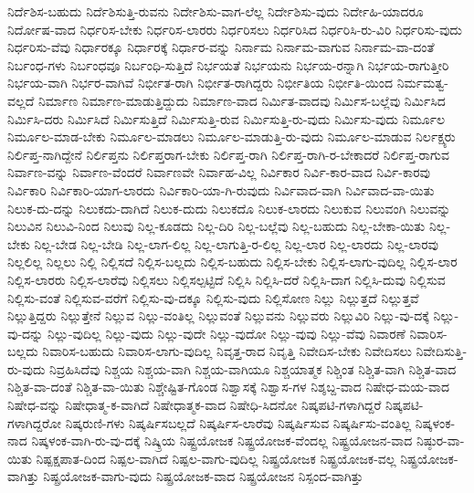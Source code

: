 {ನಿರ್ದೆಶಿಸ-ಬಹುದು
ನಿರ್ದೆಶಿಸುತ್ತಿ-ರುವನು
ನಿರ್ದೇಶಿಸು-ವಾಗ-ಲೆಲ್ಲ
ನಿರ್ದೇಶಿಸು-ವುದು
ನಿರ್ದೇಹಿ-ಯಾದರೂ
ನಿರ್ದೋಷ-ವಾದ
ನಿರ್ಧರಿಸ-ಬೇಕು
ನಿರ್ಧರಿಸ-ಲಾರರು
ನಿರ್ಧರಿಸಲು
ನಿರ್ಧರಿಸಿದ
ನಿರ್ಧರಿಸಿ-ರು-ವಿರಿ
ನಿರ್ಧರಿಸು-ವುದು
ನಿರ್ಧರಿಸು-ವೆವು
ನಿರ್ಧಾರಕ್ಕೂ
ನಿರ್ಧಾರಕ್ಕೆ
ನಿರ್ಧಾರ-ವನ್ನು
ನಿರ್ನಾಮ
ನಿರ್ನಾಮ-ವಾಗುವ
ನಿರ್ನಾಮ-ವಾ-ದಂತೆ
ನಿರ್ಬಂಧ-ಗಳು
ನಿರ್ಬಂಧವೂ
ನಿರ್ಬಂಧಿ-ಸುತ್ತಿದೆ
ನಿರ್ಭಯತೆ
ನಿರ್ಭಯನು
ನಿರ್ಭಯ-ರನ್ನಾಗಿ
ನಿರ್ಭಯ-ರಾಗುತ್ತೀರಿ
ನಿರ್ಭಯ-ವಾಗಿ
ನಿರ್ಭರ-ವಾಗಿವೆ
ನಿರ್ಭೀತ-ರಾಗಿ
ನಿರ್ಭೀತ-ರಾಗಿದ್ದರು
ನಿರ್ಭೀತಿಯ
ನಿರ್ಭೀತಿ-ಯಿಂದ
ನಿರ್ಮಮತ್ವ-ವಲ್ಲದೆ
ನಿರ್ಮಾಣ
ನಿರ್ಮಾಣ-ಮಾಡುತ್ತಿದ್ದುದು
ನಿರ್ಮಾಣ-ವಾದ
ನಿರ್ಮಿತ-ವಾದವು
ನಿರ್ಮಿಸ-ಬಲ್ಲೆವು
ನಿರ್ಮಿಸಿದ
ನಿರ್ಮಿಸಿ-ದರು
ನಿರ್ಮಿಸಿದೆ
ನಿರ್ಮಿಸುತ್ತಿದೆ
ನಿರ್ಮಿಸುತ್ತಿ-ರುವ
ನಿರ್ಮಿಸುತ್ತಿ-ರು-ವುದು
ನಿರ್ಮಿಸು-ವುದು
ನಿರ್ಮೂಲ
ನಿರ್ಮೂಲ-ಮಾಡ-ಬೇಕು
ನಿರ್ಮೂಲ-ಮಾಡಲು
ನಿರ್ಮೂಲ-ಮಾಡುತ್ತಿ-ರು-ವುದು
ನಿರ್ಮೂಲ-ಮಾಡುವ
ನಿರ್ಲಕ್ಷ್ಯರು
ನಿರ್ಲಿಪ್ತ-ನಾಗಿದ್ದೇನೆ
ನಿರ್ಲಿಪ್ತನು
ನಿರ್ಲಿಪ್ತರಾಗ-ಬೇಕು
ನಿರ್ಲಿಪ್ತ-ರಾಗಿ
ನಿರ್ಲಿಪ್ತ-ರಾಗಿ-ರ-ಬೇಕಾದರೆ
ನಿರ್ಲಿಪ್ತ-ರಾಗುವ
ನಿರ್ವಾಣ-ವನ್ನು
ನಿರ್ವಾಣ-ವೆಂದರೆ
ನಿರ್ವಾಣವೇ
ನಿರ್ವಾಹ-ವಿಲ್ಲ
ನಿರ್ವಿಕಾರ
ನಿರ್ವಿ-ಕಾರ-ವಾದ
ನಿರ್ವಿ-ಕಾರವು
ನಿರ್ವಿಕಾರಿ
ನಿರ್ವಿಕಾರಿ-ಯಾಗ-ಲಾರದು
ನಿರ್ವಿಕಾರಿ-ಯಾ-ಗಿ-ರುವುದು
ನಿರ್ವಿವಾದ-ವಾಗಿ
ನಿರ್ವಿವಾದ-ವಾ-ಯಿತು
ನಿಲುಕ-ದು-ದನ್ನು
ನಿಲುಕದು-ದಾಗಿದೆ
ನಿಲುಕ-ದುದು
ನಿಲುಕದೊ
ನಿಲುಕ-ಲಾರದು
ನಿಲುಕುವ
ನಿಲುವಂಗಿ
ನಿಲುವನ್ನು
ನಿಲುವಿನ
ನಿಲುವಿ-ನಿಂದ
ನಿಲುವು
ನಿಲ್ಲ-ಕೂಡದು
ನಿಲ್ಲ-ದಿರಿ
ನಿಲ್ಲ-ಬಲ್ಲೆವು
ನಿಲ್ಲ-ಬಹುದು
ನಿಲ್ಲ-ಬೇಕಾ-ಯಿತು
ನಿಲ್ಲ-ಬೇಕು
ನಿಲ್ಲ-ಬೇಡ
ನಿಲ್ಲ-ಬೇಡಿ
ನಿಲ್ಲ-ಲಾಗ-ಲಿಲ್ಲ
ನಿಲ್ಲ-ಲಾಗುತ್ತಿ-ರ-ಲಿಲ್ಲ
ನಿಲ್ಲ-ಲಾರ
ನಿಲ್ಲ-ಲಾರದು
ನಿಲ್ಲ-ಲಾರವು
ನಿಲ್ಲಲಿಲ್ಲ
ನಿಲ್ಲಲು
ನಿಲ್ಲಿ
ನಿಲ್ಲಿಸದೆ
ನಿಲ್ಲಿಸ-ಬಲ್ಲದು
ನಿಲ್ಲಿಸ-ಬಹುದು
ನಿಲ್ಲಿಸ-ಬೇಕು
ನಿಲ್ಲಿಸ-ಲಾಗು-ವುದಿಲ್ಲ
ನಿಲ್ಲಿಸ-ಲಾರ
ನಿಲ್ಲಿಸ-ಲಾರರು
ನಿಲ್ಲಿಸ-ಲಾರೆವು
ನಿಲ್ಲಿಸಲು
ನಿಲ್ಲಿಸಲ್ಪಟ್ಟಿದೆ
ನಿಲ್ಲಿಸಿ
ನಿಲ್ಲಿಸಿ-ದರೆ
ನಿಲ್ಲಿಸಿ-ದಾಗ
ನಿಲ್ಲಿಸಿ-ದುವು
ನಿಲ್ಲಿಸುವ
ನಿಲ್ಲಿಸು-ವಂತೆ
ನಿಲ್ಲಿಸುವ-ವರೆಗೆ
ನಿಲ್ಲಿಸು-ವು-ದಕ್ಕೂ
ನಿಲ್ಲಿಸು-ವುದು
ನಿಲ್ಲಿಸೋಣ
ನಿಲ್ಲು
ನಿಲ್ಲುತ್ತದೆ
ನಿಲ್ಲುತ್ತವೆ
ನಿಲ್ಲುತ್ತಿದ್ದರು
ನಿಲ್ಲುತ್ತೇನೆ
ನಿಲ್ಲುವ
ನಿಲ್ಲು-ವಂತಿಲ್ಲ
ನಿಲ್ಲುವಂತೆ
ನಿಲ್ಲುವನು
ನಿಲ್ಲುವರು
ನಿಲ್ಲುವಿರಿ
ನಿಲ್ಲು-ವು-ದಕ್ಕೆ
ನಿಲ್ಲು-ವು-ದನ್ನು
ನಿಲ್ಲು-ವುದಿಲ್ಲ
ನಿಲ್ಲು-ವುದು
ನಿಲ್ಲು-ವುದೇ
ನಿಲ್ಲು-ವುದೋ
ನಿಲ್ಲು-ವುವು
ನಿಲ್ಲು-ವೆವು
ನಿವಾರಣೆ
ನಿವಾರಿಸ-ಬಲ್ಲದು
ನಿವಾರಿಸ-ಬಹುದು
ನಿವಾರಿಸ-ಲಾಗು-ವುದಿಲ್ಲ
ನಿವೃತ್ತ-ರಾದ
ನಿವೃತ್ತಿ
ನಿವೇದಿಸ-ಬೇಕು
ನಿವೇದಿಸಲು
ನಿವೇದಿಸುತ್ತಿ-ರು-ವುದು
ನಿವ್ರಹಿಸಿದೆವು
ನಿಶ್ಚಯ
ನಿಶ್ಚಯ-ವಾಗಿ
ನಿಶ್ಚಯ-ವಾಗಿಯೂ
ನಿಶ್ಚಯಾತ್ಮಕ
ನಿಶ್ಚಿಂತ
ನಿಶ್ಚಿತ-ವಾಗಿ
ನಿಶ್ಚಿತ-ವಾದ
ನಿಶ್ಚಿತ-ವಾ-ದಂತೆ
ನಿಶ್ಚಿತ-ವಾ-ಯಿತು
ನಿಶ್ಚೇಷ್ಟಿತ-ಗೊಂಡ
ನಿಶ್ವಾಸಕ್ಕೆ
ನಿಶ್ವಾಸ-ಗಳ
ನಿಶ್ಶಬ್ದ-ವಾದ
ನಿಷೇಧ-ಮಯ-ವಾದ
ನಿಷೇಧ-ವನ್ನು
ನಿಷೇಧಾತ್ಮ-ಕ-ವಾಗಿದೆ
ನಿಷೇಧಾತ್ಮಕ-ವಾದ
ನಿಷೇಧಿ-ಸಿದನೋ
ನಿಷ್ಕಪಟಿ-ಗಳಾಗಿದ್ದರೆ
ನಿಷ್ಕಪಟಿ-ಗಳಾಗಿದ್ದರೋ
ನಿಷ್ಕರುಣಿ-ಗಳು
ನಿಷ್ಕರ್ಷಿಸಬಲ್ಲದೆ
ನಿಷ್ಕರ್ಷಿಸ-ಲಾರೆವು
ನಿಷ್ಕರ್ಷಿಸುವ
ನಿಷ್ಕರ್ಷಿಸು-ವಂತಿಲ್ಲ
ನಿಷ್ಕಳಂಕ-ನಾದ
ನಿಷ್ಕಳಂಕ-ವಾಗಿ-ರು-ವು-ದಕ್ಕೆ
ನಿಷ್ಕ್ರಿಯ
ನಿಷ್ಟ್ರಯೋಜಕ
ನಿಷ್ಟ್ರಯೋಜಕ-ವೆಂದಲ್ಲ
ನಿಷ್ಟ್ರಯೋಜನ-ವಾದ
ನಿಷ್ಠುರ-ವಾ-ಯಿತು
ನಿಷ್ಪಕ್ಷಪಾತ-ದಿಂದ
ನಿಷ್ಪಲ-ವಾಗಿದೆ
ನಿಷ್ಪಲ-ವಾಗು-ವುದಿಲ್ಲ
ನಿಷ್ಪ್ರಯೋಜಕ
ನಿಷ್ಪ್ರಯೋಜಕ-ವಲ್ಲ
ನಿಷ್ಪ್ರಯೋಜಕ-ವಾಗಿತ್ತು
ನಿಷ್ಪ್ರಯೋಜಕ-ವಾಗು-ವುದು
ನಿಷ್ಪ್ರಯೋಜಕ-ವಾದ
ನಿಷ್ಪ್ರಯೋಜನ
ನಿಸ್ಪಂದ-ವಾಗಿತ್ತು
}
